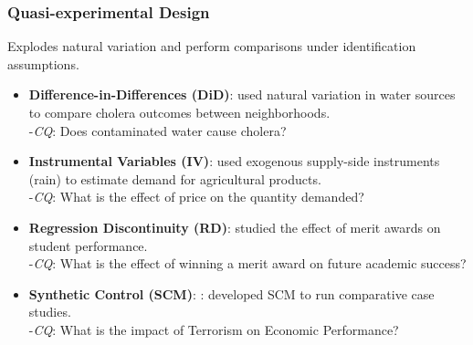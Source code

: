 \documentclass[xcolor=svgnames,t]{beamer}
\begin{document}
\begin{frame}
    \frametitle{Quasi-experimental Design}
    
    \small %
    Explodes natural variation and perform comparisons under identification assumptions.
    \pause
    \begin{itemize}
        \item \textbf{Difference-in-Differences (DiD)}: \cite{snow1854} used natural variation in water sources to compare cholera outcomes between neighborhoods. \\
            \hspace{10pt}-\textit{CQ}: Does contaminated water cause cholera?
        
        \pause %
        \item \textbf{Instrumental Variables (IV)}: \cite{wright1928} used exogenous supply-side instruments (rain) to estimate demand for agricultural products. \\
            \hspace{10pt}-\textit{CQ}: What is the effect of price on the quantity demanded?
        
        \pause %
        \item \textbf{Regression Discontinuity (RD)}: \cite{thistlethwaite1960} studied the effect of merit awards on student performance. \\
            \hspace{10pt}-\textit{CQ}: What is the effect of winning a merit award on future academic success?
        
        \pause %
        \item \textbf{Synthetic Control (SCM)}: \cite{abadie2003}: developed SCM to run comparative case studies. \\
            \hspace{10pt}-\textit{CQ}: What is the impact of Terrorism on Economic Performance?
    \end{itemize}
\end{frame}
\end{document}
